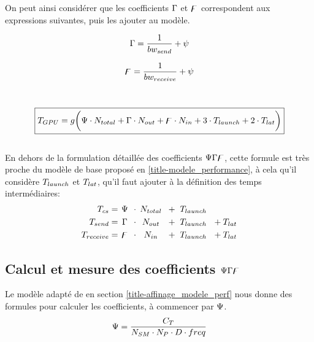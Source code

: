 On peut ainsi considérer que les coefficients $\Gamma$ et $\digamma$ correspondent aux expressions suivantes, puis les ajouter au modèle.\\

\noindent\begin{minipage}{.5\linewidth}
	\begin{equation}
	\Gamma = \frac{1}{bw_{send}} + \psi
	\end{equation}
\end{minipage}%
\begin{minipage}{.5\linewidth}
	\begin{equation}
	\digamma = \frac{1}{bw_{receive}}  + \psi
	\end{equation}
\end{minipage}\\[\baselineskip]
\begin{equation}
\boxed{T_{GPU} = g \bigg( \Psi \cdot N_{total}  + \Gamma \cdot N_{out} + \digamma \cdot N_{in} + 3\cdot T_{launch} +2\cdot T_{lat} \bigg)}
\end{equation}\\[-\baselineskip]

En dehors de la formulation détaillée des coefficients $\Psi\Gamma\digamma$, cette formule est très proche du modèle de base proposé en \ref{title-modele_performance}, à cela qu'il considère $T_{launch}$ et $T_{lat}$, qu'il faut ajouter à la définition des temps intermédiaires:
\begin{align}
\Time_{cs}           &= \text{\makebox[10pt][c]{$\cscoef$} }\cdot  \text{\makebox[30pt][c]{$N_{total}$} } + \text{\makebox[38pt][c]{$ \Time_{launch}$} } \\
\Time_{send}      &=\text{\makebox[10pt][c]{$\scoef$} }   \cdot   \text{\makebox[30pt][c]{$N_{out}$} }   + \text{\makebox[38pt][c]{$ \Time_{launch}$} }+\Time_{lat} \\
\Time_{receive} &=  \text{\makebox[10pt][c]{$\rcoef$} } \cdot  \text{\makebox[30pt][c]{$N_{in}$} }       + \text{\makebox[38pt][c]{$ \Time_{launch}$} } +\Time_{lat}
\end{align}




\subsection{Calcul et mesure des coefficients $\Psi\Gamma\digamma$ } \label{title-calcul_coeff}
Le modèle adapté de \cite{albuquerque_performance_2012} en section \ref{title-affinage_modele_perf} nous donne des formules pour calculer les coefficients, à commencer par $\Psi $.
\begin{equation*}
\Psi = \frac{C_T}{N_{SM}\cdot N_P \cdot D \cdot freq}
\end{equation*}\\[-\baselineskip]

